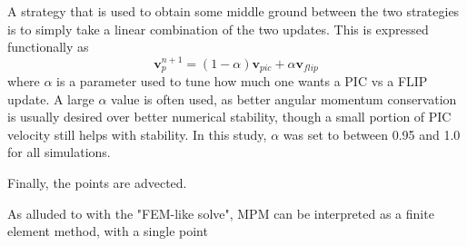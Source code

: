 A strategy that is used to obtain some middle ground between the two strategies is to simply take a linear combination of the two updates. This is expressed functionally as
\begin{equation}
\bm{v}^{n+1}_p=(1-\alpha)\bm{v}_{pic} + \alpha \bm{v}_{flip}
\end{equation}
where $\alpha$ is a parameter used to tune how much one wants a PIC vs a FLIP update. A large $\alpha$ value is often used, as better angular momentum conservation is usually desired over better numerical stability, though a small portion of PIC velocity still helps with stability. In this study, $\alpha$ was set to between 0.95 and 1.0 for all simulations. 

Finally, the points are advected. 

As alluded to with the "FEM-like solve", MPM can be interpreted as a finite element method, with a single point 